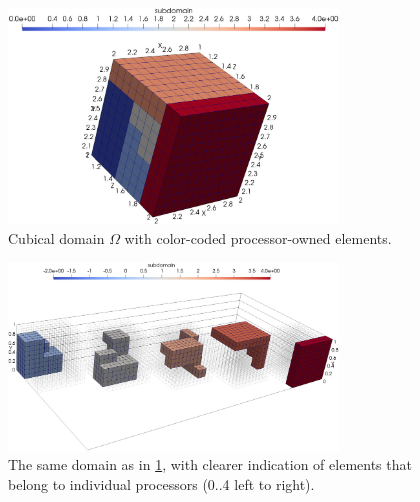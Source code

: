 \begin{figure}[H]
		\begin{center}
			\includegraphics[width=0.78\textwidth]{img/mesh/cube.jpg}
			\vspace{-2mm}
		\caption{Cubical domain $\Omega$ with color-coded processor-owned elements.}
		\label{figure:domainDecomposition}
		\end{center}
	\end{figure}\vspace{-5mm}
	
\begin{figure}[H]
		\begin{center}
			\includegraphics[width=0.78\textwidth]{img/mesh/cubeSub.jpg}
			\vspace{-2mm}
		\caption{The same domain as in \cref{figure:domainDecomposition}, with clearer indication of elements that belong to individual processors (0..4 left to right).}
		\label{figure:domainDecomposition2}
		\end{center}
	\end{figure}\vspace{-5mm}
	